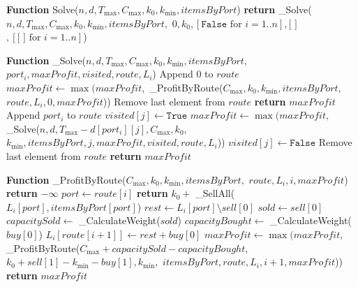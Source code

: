 \documentclass[12pt, a4paper]{article}
\begin{document}
\begin{algorithmic}[1]

\STATE \textbf{Function} Solve($n, d, T_{\max}, C_{\max}, k_0, k_{\min}, itemsByPort$)
\STATE \textbf{return} \_Solve($n, d, T_{\max}, C_{\max}, k_0, k_{\min}, itemsByPort,$
\STATE \hspace{1cm} $0, k_0, [\texttt{False} \text{ for } i=1..n], \text{[ ]}$ $,[\text{[ ]} \text{ for } i=1..n]$)

\STATE

\STATE \textbf{Function} \_Solve($n, d, T_{\max}, C_{\max}, k_0, k_{\min}, itemsByPort,$
\STATE \hspace{1cm} $port_i, maxProfit, visited, route, L_i$)
    \STATE Append $0$ to $route$
    \STATE $maxProfit \gets \max(maxProfit,$ 
    \STATE \hspace{1cm} \_ProfitByRoute($C_{\max}, k_0, k_{\min}, itemsByPort,$
    \STATE \hspace{2cm} $route, L_i, 0, maxProfit$))
    \STATE Remove last element from $route$
    \STATE \textbf{return} $maxProfit$
\ENDIF
\STATE Append $port_i$ to $route$
        \STATE $visited[j] \gets \texttt{True}$
        \STATE $maxProfit \gets \max(maxProfit,$ 
        \STATE \hspace{1cm} \_Solve($n, d, T_{\max} - d[port_i][j], C_{\max}, k_0,$
        \STATE \hspace{2cm} $k_{\min}, itemsByPort, j, maxProfit, visited, route, L_i$))
        \STATE $visited[j] \gets \texttt{False}$
    \ENDIF
\ENDFOR
\STATE Remove last element from $route$
\STATE \textbf{return} $maxProfit$

\STATE

\STATE \textbf{Function} \_ProfitByRoute($C_{\max}, k_0, k_{\min}, itemsByPort,$
\STATE \hspace{1cm} $route, L_i, i, maxProfit$)
    \STATE \textbf{return} $-\infty$
\ENDIF
\STATE $port \gets route[i]$
    \STATE \textbf{return} $k_0 +$ \_SellAll($L_i[port], itemsByPort[port]$)
\ENDIF
{}
    \STATE $rest \gets L_i[port] \setminus sell[0]$
    \STATE $sold \gets sell[0]$
    \STATE $capacitySold \gets$ \_CalculateWeight($sold$)
        \STATE $capacityBought \gets$ \_CalculateWeight($buy[0]$)
        \STATE $L_i[route[i+1]] \gets rest + buy[0]$
        \STATE $maxProfit \gets \max(maxProfit,$ 
        \STATE \hspace{1cm} \_ProfitByRoute($C_{\max}+capacitySold-capacityBought,$
        \STATE \hspace{2cm} $k_0+sell[1]-k_{\min}-buy[1], k_{\min},$
        \STATE \hspace{2cm} $itemsByPort, route, L_i, i+1, maxProfit$))
    \ENDFOR
\ENDFOR
\STATE \textbf{return} $maxProfit$


\end{algorithmic}
\end{document}
